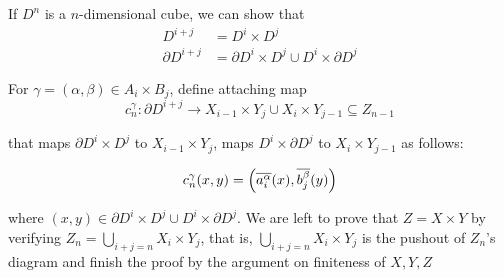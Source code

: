 \documentclass{article}
\begin{document}
If $D^n$ is a $n$-dimensional cube, we can show that
\begin{align*}
    D^{i + j} &= D^i \times D^j \\
    \partial D^{i + j} &= \partial D^i \times D^j \cup  D^i \times \partial D^j
\end{align*}

For $\gamma = (\alpha, \beta) \in A_i \times B_j$, define attaching map 
$$
    c_n^{\gamma}: \partial D^{i + j} \to X_{i-1} \times Y_j \cup X_i \times Y_{j-1} \subseteq Z_{n-1}
$$

that maps $\partial D^i \times D^j$ to $X_{i-1} \times Y_j$, maps $D^i \times \partial D^j$ to $X_i \times Y_{j-1}$ as follows:

$$
    c_n^{\gamma}(x, y) = \tuple*{\overline{a_i^\alpha}(x), \overline{b_j^\beta}(y)}
$$

where $(x, y) \in \partial D^i \times D^j \cup  D^i \times \partial D^j$. We are left to prove that $Z = X \times Y$ by verifying $Z_n = \bigcup_{i + j = n} X_i \times Y_j$, that is, $\bigcup_{i + j = n} X_i \times Y_j$ is the pushout of $Z_n$'s diagram and finish the proof by the argument on finiteness of $X, Y, Z$
\end{document}

